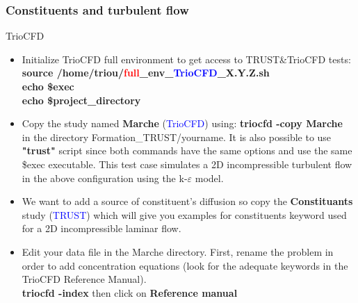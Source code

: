 \documentclass[10pt, hyperref={unicode=true,pdfusetitle, bookmarks=true,bookmarksnumbered=false,bookmarksopen=false, breaklinks=false,pdfborder={0 0 1},backref=true,colorlinks=true,linkcolor=darkblue,pageanchor}]{beamer}
\begin{document}
\begin{frame}
\frametitle{Constituents and turbulent flow}
\begin{block}{TrioCFD}

\begin{itemize}

\item Initialize TrioCFD full environment to get access to TRUST\&TrioCFD tests:\\
{\small{
\textbf{source /home/triou/\textcolor{red}{full}\_env\_\textcolor{blue}{TrioCFD}\_X.Y.Z.sh }\\
\textbf{echo \$exec} \\
\textbf{echo \$project\_directory} \\
}}

\item Copy the study named \textbf{Marche} (\textcolor{blue}{TrioCFD}) using: \textbf{triocfd -copy Marche}\\
in the directory Formation\_TRUST/yourname. It is also possible to use \textbf{"trust"} script since both commands have the same options and use the same \$exec executable. This test case simulates a 2D incompressible turbulent flow in the above configuration using the k-$\varepsilon$ model.

\item We want to add a source of constituent's diffusion so copy the \textbf{Constituants} study (\textcolor{blue}{TRUST}) which will give you examples for constituents keyword used for a 2D incompressible laminar flow.

\item Edit your data file in the Marche directory. First, rename the problem in order to add concentration equations (look for the adequate keywords in the TrioCFD Reference Manual).\\
\textbf{triocfd -index} then click on \textbf{Reference manual}


\end{itemize}

\end{block}
\end{frame}
\end{document}
